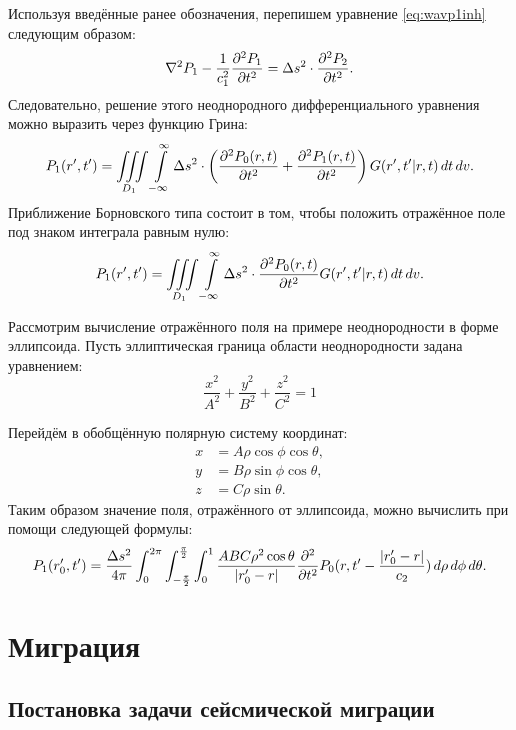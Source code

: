\documentclass[a4paper, fontsize=14pt]{article}
\begin{document}
	Используя введённые ранее обозначения, перепишем уравнение \eqref{eq:wavp1inh} следующим образом:
	\begin{equation}
		\nabla^2 P_1 - \frac{1}{c_1^2}\diff[2]{P_1}{t}  = \Delta s^2 \cdot \diff[2]{P_2}{t}.
	\end{equation}
	Следовательно, решение этого неоднородного дифференциального уравнения можно выразить через функцию Грина:
	\begin{equation}
		P_1(r',t')   = \iiint\limits_{D_1} \int\limits_{-\infty}^{\infty} \Delta s^2 \cdot \left(\diff[2]{P_0(r,t)}{t}+\diff[2]{P_1(r,t)}{t}\right) G(r',t'|r,t)\, dt \, dv.
	\end{equation}
	Приближение Борновского типа состоит в том, чтобы положить отражённое поле под знаком интеграла равным нулю:
	\begin{equation}
		P_1(r',t')   = \iiint\limits_{D_1} \int\limits_{-\infty}^{\infty} \Delta s^2 \cdot 	\diff[2]{P_0(r,t)}{t} G(r',t'|r,t)\, dt \, dv.
	\end{equation}
	
	Рассмотрим вычисление отражённого поля на примере неоднородности в форме эллипсоида. Пусть эллиптическая граница области неоднородности задана уравнением:
	\begin{equation}
		\frac{x^2}{A^2} + \frac{y^2}{B^2} + \frac{z^2}{C^2} = 1
	\end{equation}
	
	Перейдём в обобщённую полярную систему координат:
	\begin{align*}
		x &= A \rho \cos \phi \cos \theta, \\
		y &= B \rho \sin \phi \cos \theta, \\
		z &= C \rho \sin \theta. 
	\end{align*}
	Таким образом значение поля, отражённого от эллипсоида, можно вычислить при помощи следующей формулы:
	\begin{equation}
		P_1(r_0',t') = \frac{\Delta s^2}{4\pi} \int_{0}^{2\pi} \int_{-\frac{\pi}{2}}^{\frac{\pi}{2}} \int_{0}^{1} \frac{ABC \rho^2 \cos \theta}{|r_0'-r|} \diff[2]{}{t}P_0(r,t' - \frac{|r_0'-r|}{c_2}) \,d\rho \, d\phi \, d \theta.
		\label{eq:bornellipse}
	\end{equation}
	
	
	\section{Миграция}
	\subsection{Постановка задачи сейсмической миграции}
	
\end{document}
